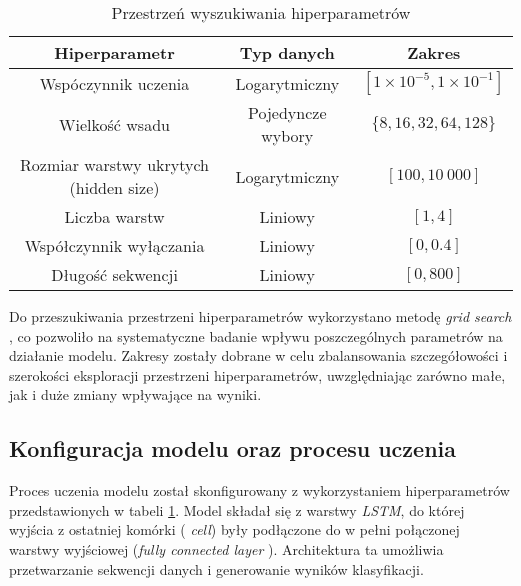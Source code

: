 \documentclass[eeg_v4.tex]{subfiles}
\begin{document}
    \begin{table}[h!]
        \centering
        \begin{tabular}{|c|c|c|}
            \hline
            \textbf{Hiperparametr}                 & \textbf{Typ danych} & \textbf{Zakres}                        \\
            \hline
            Wspóczynnik uczenia                    & Logarytmiczny       & $[1 \times 10^{-5}, 1 \times 10^{-1}]$ \\
            \hline
            Wielkość wsadu                         & Pojedyncze wybory   & $\{8, 16, 32, 64, 128\}$               \\
            \hline
            Rozmiar warstwy ukrytych (hidden size) & Logarytmiczny       & $[100, 10\ 000]$                       \\
            \hline
            Liczba warstw                          & Liniowy             & $[1, 4]$                               \\
            \hline
            Współczynnik wyłączania                & Liniowy             & $[0, 0.4]$                             \\
            \hline
            Długość sekwencji                      & Liniowy             & $[0, 800]$                             \\
            \hline
        \end{tabular}
        \caption{Przestrzeń wyszukiwania hiperparametrów}
        \label{tab:hyperparameters}
    \end{table}

    Do przeszukiwania przestrzeni hiperparametrów wykorzystano metodę \textit{grid search}
    , co pozwoliło na systematyczne badanie wpływu poszczególnych parametrów na działanie modelu. Zakresy zostały
    dobrane w celu zbalansowania szczegółowości i szerokości eksploracji przestrzeni hiperparametrów, uwzględniając
    zarówno małe, jak i duże zmiany wpływające na wyniki.

    \subsection{Konfiguracja modelu oraz procesu uczenia}

    Proces uczenia modelu został skonfigurowany z wykorzystaniem hiperparametrów przedstawionych w tabeli
    \ref{tab:hyperparameters}. Model składał się z warstwy \textit{LSTM}, do której wyjścia z ostatniej komórki (
    \textit{cell}) były podłączone do w pełni połączonej warstwy wyjściowej (\textit{fully connected layer}
    ). Architektura ta umożliwia przetwarzanie sekwencji danych i generowanie wyników klasyfikacji.
\end{document}
